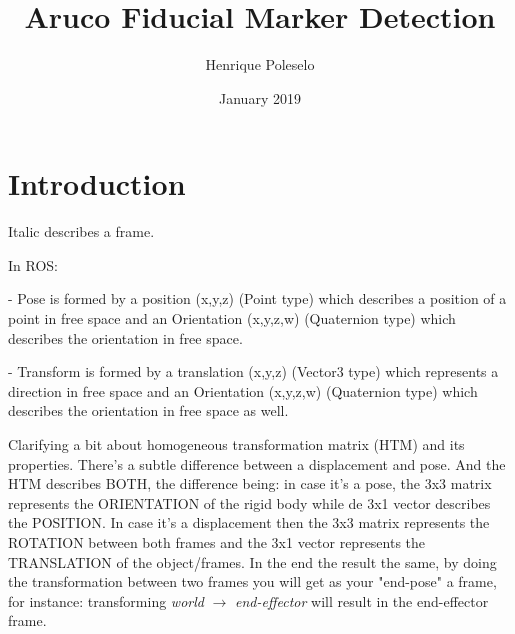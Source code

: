 \documentclass{article}
\title{Aruco Fiducial Marker Detection}
\author{Henrique Poleselo }
\date{January 2019}
\begin{document}
\maketitle

\section{Introduction}
Italic describes a frame.

In ROS:

- Pose is formed by a position (x,y,z) (Point type) which describes a position of a point in free space and an Orientation (x,y,z,w) (Quaternion type) which describes the orientation in free space.

- Transform is formed by a translation (x,y,z) (Vector3 type) which represents a direction in free space and an Orientation (x,y,z,w) (Quaternion type) which describes the orientation in free space as well.

Clarifying a bit about homogeneous transformation matrix (HTM) and its properties. There's a subtle difference between a displacement and pose. And the HTM describes BOTH, the difference being: in case it's a pose, the 3x3 matrix represents the ORIENTATION of the rigid body while de 3x1 vector describes the POSITION. In case it's a displacement then the 3x3 matrix represents the ROTATION between both frames and the 3x1 vector represents the TRANSLATION of the object/frames. In the end the result the same, by doing the transformation between two frames you will get as your "end-pose" a frame, for instance: transforming \textit{world} $\xrightarrow{}$ \textit{end-effector} will result in the end-effector frame.
\end{document}
